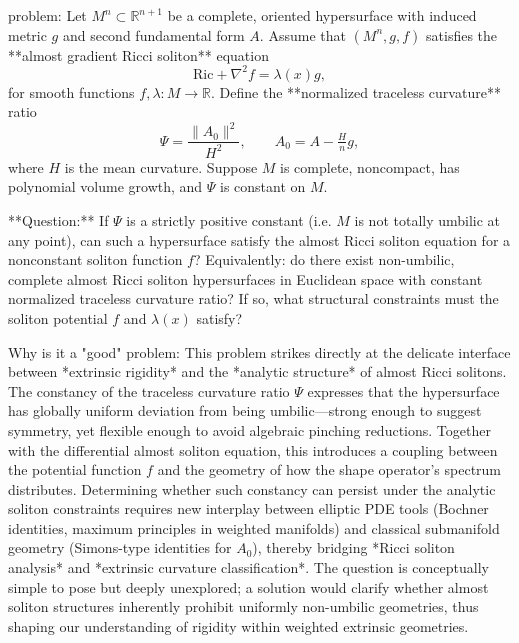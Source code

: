 problem:  
Let \( M^n \subset \mathbb{R}^{n+1} \) be a complete, oriented hypersurface with induced metric \( g \) and second fundamental form \( A \). Assume that \( (M^n,g,f) \) satisfies the **almost gradient Ricci soliton** equation  
\[
\mathrm{Ric} + \nabla^2 f = \lambda(x) g,
\]
for smooth functions \( f, \lambda: M \to \mathbb{R} \). Define the **normalized traceless curvature** ratio  
\[
\Psi = \frac{\|A_0\|^2}{H^2},
\qquad A_0 = A - \tfrac{H}{n} g,
\]
where \(H\) is the mean curvature. Suppose \(M\) is complete, noncompact, has polynomial volume growth, and \( \Psi \) is constant on \(M\).  

**Question:**  
If \( \Psi \) is a strictly positive constant (i.e. \(M\) is not totally umbilic at any point), can such a hypersurface satisfy the almost Ricci soliton equation for a nonconstant soliton function \(f\)?  
Equivalently: do there exist non-umbilic, complete almost Ricci soliton hypersurfaces in Euclidean space with constant normalized traceless curvature ratio? If so, what structural constraints must the soliton potential \(f\) and \(\lambda(x)\) satisfy?  

Why is it a "good" problem:  
This problem strikes directly at the delicate interface between *extrinsic rigidity* and the *analytic structure* of almost Ricci solitons. The constancy of the traceless curvature ratio \( \Psi \) expresses that the hypersurface has globally uniform deviation from being umbilic—strong enough to suggest symmetry, yet flexible enough to avoid algebraic pinching reductions. Together with the differential almost soliton equation, this introduces a coupling between the potential function \(f\) and the geometry of how the shape operator’s spectrum distributes. Determining whether such constancy can persist under the analytic soliton constraints requires new interplay between elliptic PDE tools (Bochner identities, maximum principles in weighted manifolds) and classical submanifold geometry (Simons-type identities for \(A_0\)), thereby bridging *Ricci soliton analysis* and *extrinsic curvature classification*.  
The question is conceptually simple to pose but deeply unexplored; a solution would clarify whether almost soliton structures inherently prohibit uniformly non-umbilic geometries, thus shaping our understanding of rigidity within weighted extrinsic geometries.